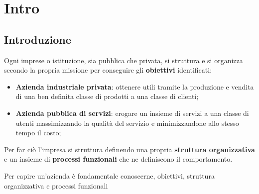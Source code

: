 \chapter{Intro}\label{chap:intro} %
\section{Introduzione}\label{sec:introduzione} %
Ogni imprese o istituzione, sia pubblica che privata, si struttura e si organizza secondo la propria missione per conseguire gli \textbf{obiettivi} identificati:
\begin{itemize}
    \item \textbf{Azienda industriale privata}: ottenere utili tramite la produzione e vendita di una ben definita classe di prodotti a una classe di clienti;
    \item \textbf{Azienda pubblica di servizi}: erogare un insieme di servizi a una classe di utenti massimizzando la qualità del servizio e minimizzandone allo stesso tempo il costo;
\end{itemize}
Per far ciò l'impresa si struttura definendo una propria \textbf{struttura organizzativa} e un insieme di \textbf{processi funzionali} che ne definiscono il comportamento.
\begin{note}
    Per capire un'azienda è fondamentale conoscerne, obiettivi, struttura organizzativa e processi funzionali
\end{note}
%
